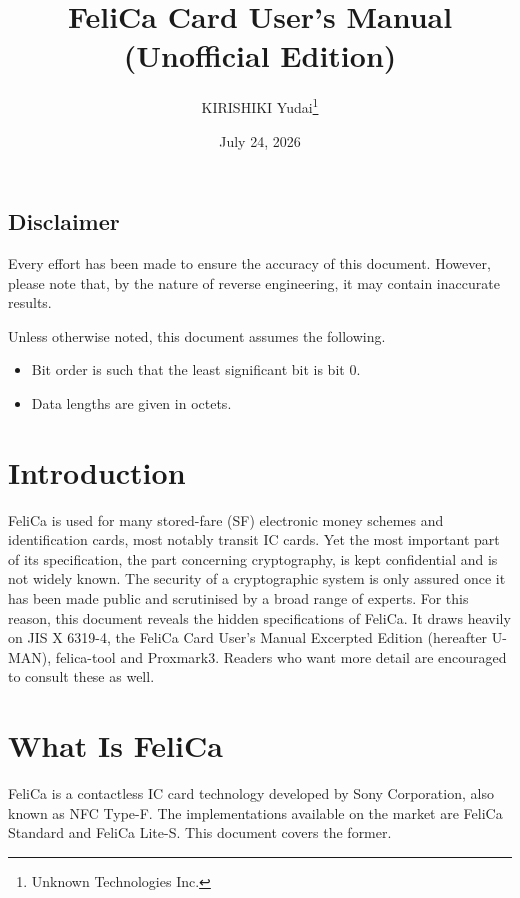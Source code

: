 \documentclass[a4paper,11pt]{report}
\title{FeliCa Card User's Manual (Unofficial Edition)}
\author{KIRISHIKI Yudai\thanks{Unknown Technologies Inc.}}
\date{July 24, 2026}
\begin{document}
\maketitle

\section*{Disclaimer}

Every effort has been made to ensure the accuracy of this document. However, please note that, by the nature of reverse engineering, it may contain inaccurate results.

Unless otherwise noted, this document assumes the following.

\begin{itemize}
    \item Bit order is such that the least significant bit is bit 0.
    \item Data lengths are given in octets.
\end{itemize}

\tableofcontents

\chapter{Introduction}

FeliCa is used for many stored-fare (SF) electronic money schemes and identification cards, most notably transit IC cards. Yet the most important part of its specification, the part concerning cryptography, is kept confidential and is not widely known. The security of a cryptographic system is only assured once it has been made public and scrutinised by a broad range of experts. For this reason, this document reveals the hidden specifications of FeliCa. It draws heavily on JIS X 6319-4\cite{jis-x-6319-4-2016-en}, the FeliCa Card User's Manual Excerpted Edition (hereafter U-MAN)\cite{felica-usersmanual-en}, felica-tool\cite{felica-tool} and Proxmark3\cite{proxmark3}. Readers who want more detail are encouraged to consult these as well.

\chapter{What Is FeliCa}

FeliCa is a contactless IC card technology developed by Sony Corporation, also known as NFC Type-F. The implementations available on the market are FeliCa Standard and FeliCa Lite-S. This document covers the former.
\end{document}
